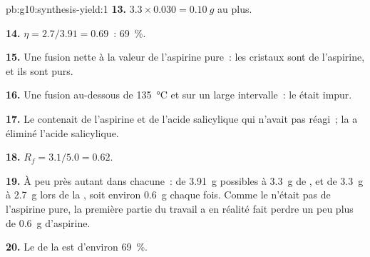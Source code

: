 \begin{solution}{pb:g10:synthesis-yield:1}
\textbf{13.} $3.3 \times 0.030 = \qty{0.10}{g}$ au plus.

\textbf{14.} $\eta = 2.7 / 3.91 = 0.69$~: \qty{69}{\percent}.

\textbf{15.} Une fusion nette à la valeur de l'aspirine pure~: les
cristaux sont de l'aspirine, et ils sont purs.

\textbf{16.} Une fusion au-dessous de \qty{135}{\celsius} et sur un large
intervalle~: le  était impur.

\textbf{17.} Le  contenait de l'aspirine et de l'acide
salicylique qui n'avait pas réagi~; la  a éliminé
l'acide salicylique.

\textbf{18.} $R_f = 3.1 / 5.0 = 0.62$.

\textbf{19.} À peu près autant dans chacune~: de \qty{3.91}{g} possibles
à \qty{3.3}{g} de , et de \qty{3.3}{g} à \qty{2.7}{g} lors
de la , soit environ \qty{0.6}{g} chaque fois. Comme le
 n'était pas de l'aspirine pure, la première partie du
travail a en réalité fait perdre un peu plus de \qty{0.6}{g}
d'aspirine.

\textbf{20.} Le  de la  est d'environ
\qty{69}{\percent}.
\end{solution}
